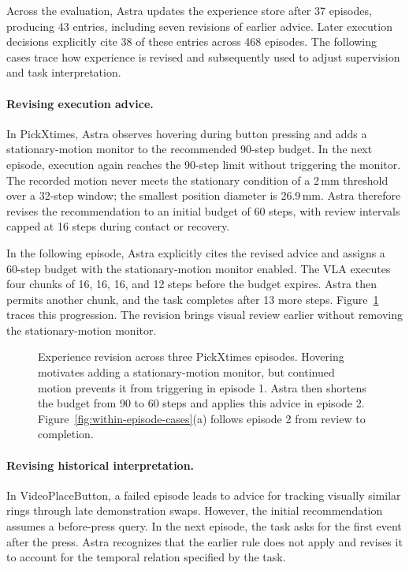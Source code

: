 Across the evaluation, Astra updates the experience store after 37 episodes, producing 43 entries, including seven revisions of earlier advice. Later execution decisions explicitly cite 38 of these entries across 468 episodes. The following cases trace how experience is revised and subsequently used to adjust supervision and task interpretation.

\paragraph{Revising execution advice.}
In PickXtimes, Astra observes hovering during button pressing and adds a stationary-motion monitor to the recommended 90-step budget. In the next episode, execution again reaches the 90-step limit without triggering the monitor. The recorded motion never meets the stationary condition of a 2\,mm threshold over a 32-step window; the smallest position diameter is 26.9\,mm. Astra therefore revises the recommendation to an initial budget of 60 steps, with review intervals capped at 16 steps during contact or recovery.

In the following episode, Astra explicitly cites the revised advice and assigns a 60-step budget with the stationary-motion monitor enabled. The VLA executes four chunks of 16, 16, 16, and 12 steps before the budget expires. Astra then permits another chunk, and the task completes after 13 more steps. Figure~\ref{fig:trace} traces this progression. The revision brings visual review earlier without removing the stationary-motion monitor.

\begin{figure}[!t]
\centering
\captionsetup{font=small}
\hfill
{}\hfill
{}
\caption{Experience revision across three PickXtimes episodes. Hovering motivates adding a stationary-motion monitor, but continued motion prevents it from triggering in episode 1. Astra then shortens the budget from 90 to 60 steps and applies this advice in episode 2. Figure~\ref{fig:within-episode-cases}(a) follows episode 2 from review to completion.}
\label{fig:trace}
\end{figure}

\paragraph{Revising historical interpretation.}
In VideoPlaceButton, a failed episode leads to advice for tracking visually similar rings through late demonstration swaps. However, the initial recommendation assumes a before-press query. In the next episode, the task asks for the first event after the press. Astra recognizes that the earlier rule does not apply and revises it to account for the temporal relation specified by the task.

